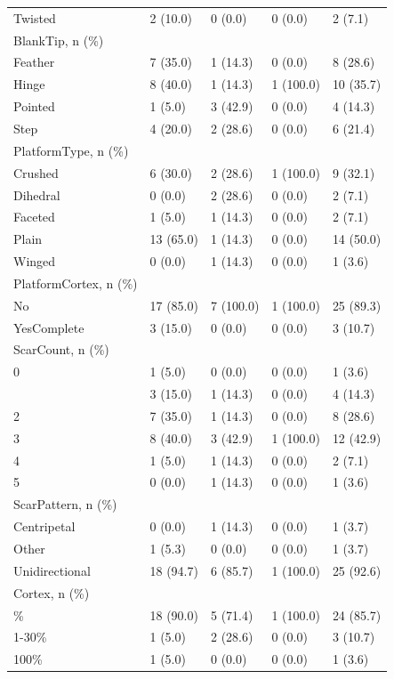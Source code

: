 \documentclass[12pt,twoside]{reedthesis}
\begin{document}
\begin{longtable}[t]{lllll}
Twisted & 2 (10.0) & 0 (0.0) & 0 (0.0) & 2 (7.1)\\
BlankTip, n (\%) &  &  &  & \\
\addlinespace
Feather & 7 (35.0) & 1 (14.3) & 0 (0.0) & 8 (28.6)\\
Hinge & 8 (40.0) & 1 (14.3) & 1 (100.0) & 10 (35.7)\\
Pointed & 1 (5.0) & 3 (42.9) & 0 (0.0) & 4 (14.3)\\
Step & 4 (20.0) & 2 (28.6) & 0 (0.0) & 6 (21.4)\\
PlatformType, n (\%) &  &  &  & \\
\addlinespace
Crushed & 6 (30.0) & 2 (28.6) & 1 (100.0) & 9 (32.1)\\
Dihedral & 0 (0.0) & 2 (28.6) & 0 (0.0) & 2 (7.1)\\
Faceted & 1 (5.0) & 1 (14.3) & 0 (0.0) & 2 (7.1)\\
Plain & 13 (65.0) & 1 (14.3) & 0 (0.0) & 14 (50.0)\\
Winged & 0 (0.0) & 1 (14.3) & 0 (0.0) & 1 (3.6)\\
\addlinespace
PlatformCortex, n (\%) &  &  &  & \\
No & 17 (85.0) & 7 (100.0) & 1 (100.0) & 25 (89.3)\\
YesComplete & 3 (15.0) & 0 (0.0) & 0 (0.0) & 3 (10.7)\\
ScarCount, n (\%) &  &  &  & \\
0 & 1 (5.0) & 0 (0.0) & 0 (0.0) & 1 (3.6)\\
\addlinespace
1 & 3 (15.0) & 1 (14.3) & 0 (0.0) & 4 (14.3)\\
2 & 7 (35.0) & 1 (14.3) & 0 (0.0) & 8 (28.6)\\
3 & 8 (40.0) & 3 (42.9) & 1 (100.0) & 12 (42.9)\\
4 & 1 (5.0) & 1 (14.3) & 0 (0.0) & 2 (7.1)\\
5 & 0 (0.0) & 1 (14.3) & 0 (0.0) & 1 (3.6)\\
\addlinespace
ScarPattern, n (\%) &  &  &  & \\
Centripetal & 0 (0.0) & 1 (14.3) & 0 (0.0) & 1 (3.7)\\
Other & 1 (5.3) & 0 (0.0) & 0 (0.0) & 1 (3.7)\\
Unidirectional & 18 (94.7) & 6 (85.7) & 1 (100.0) & 25 (92.6)\\
Cortex, n (\%) &  &  &  & \\
\addlinespace
0\% & 18 (90.0) & 5 (71.4) & 1 (100.0) & 24 (85.7)\\
1-30\% & 1 (5.0) & 2 (28.6) & 0 (0.0) & 3 (10.7)\\
100\% & 1 (5.0) & 0 (0.0) & 0 (0.0) & 1 (3.6)\\*
\end{longtable}
\endgroup{}
\end{document}
